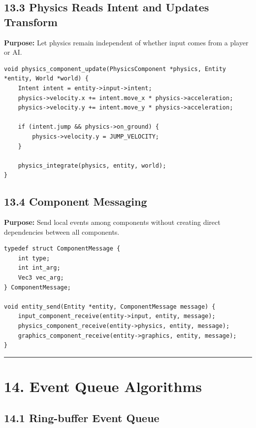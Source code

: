 \documentclass[10pt,letterpaper]{article}
\begin{document}
\subsection{13.3 Physics Reads Intent and Updates Transform}

\textbf{Purpose:} Let physics remain independent of whether input comes from a player or AI.

\begin{verbatim}
void physics_component_update(PhysicsComponent *physics, Entity *entity, World *world) {
    Intent intent = entity->input->intent;
    physics->velocity.x += intent.move_x * physics->acceleration;
    physics->velocity.y += intent.move_y * physics->acceleration;

    if (intent.jump && physics->on_ground) {
        physics->velocity.y = JUMP_VELOCITY;
    }

    physics_integrate(physics, entity, world);
}
\end{verbatim}

\subsection{13.4 Component Messaging}

\textbf{Purpose:} Send local events among components without creating direct dependencies between all components.

\begin{verbatim}
typedef struct ComponentMessage {
    int type;
    int int_arg;
    Vec3 vec_arg;
} ComponentMessage;

void entity_send(Entity *entity, ComponentMessage message) {
    input_component_receive(entity->input, entity, message);
    physics_component_receive(entity->physics, entity, message);
    graphics_component_receive(entity->graphics, entity, message);
}
\end{verbatim}

\medskip\hrule\medskip

\clearpage
\section{14. Event Queue Algorithms}

\subsection{14.1 Ring-buffer Event Queue}
\end{document}
